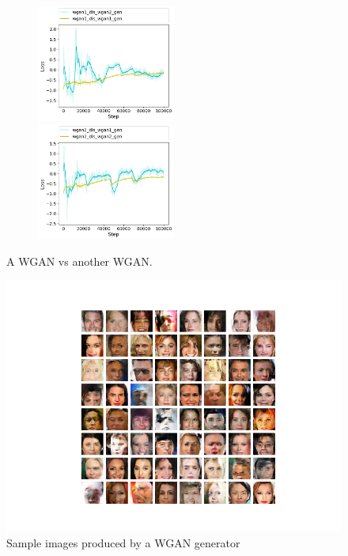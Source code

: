 \begin{figure}[h!] 
	\begin{subfigure}[b]{\textwidth}		
		\includegraphics[width=0.5\textwidth]{figures/cross_dis/trial17_wgan1_dis_wgan2_gen}
		\includegraphics[width=0.5\textwidth]{figures/cross_dis/trial17_wgan2_dis_wgan1_gen}
	\end{subfigure}
	\caption{A WGAN vs another WGAN.}
\end{figure}

\begin{figure}[h]
	\includegraphics[scale=1.0]{figures/wgan_palette}
	\caption{Sample images produced by a WGAN generator}
\end{figure}


